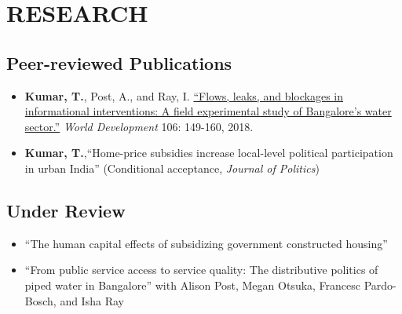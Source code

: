 \documentclass[10pt]{article}
\begin{document}
\section*{RESEARCH}



\subsection*{Peer-reviewed Publications}
\begin{itemize}
		\item[] \textbf{Kumar, T.}, Post, A., and Ray, I. \href{https://www.sciencedirect.com/science/article/pii/S0305750X1830032}{``Flows, leaks, and blockages in informational interventions: A field experimental study of Bangalore's water sector.''} \textit{World Development} 106: 149-160, 2018.
		
			\item[] \textbf{Kumar, T.},``Home-price subsidies increase local-level political participation in urban India'' (Conditional acceptance, \textit{Journal of Politics})
\end{itemize}

\subsection*{Under Review}

\begin{itemize}

	\item[]``The human capital effects of subsidizing government constructed housing'' 

	
		\item[]``From public service access to service quality: The distributive politics of piped water in Bangalore'' with Alison Post, Megan Otsuka, Francesc Pardo-Bosch, and Isha Ray 
	
		\end{itemize}
		
\end{document}
